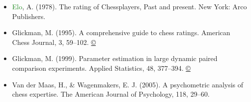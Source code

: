 \documentclass[12pt]{article}
\begin{document}
\begin{itemize}
        \item \textcolor{ForestGreen}{Elo}, A. (1978). The rating of Chessplayers, Past and present. New York: Arco Publishers.
        \item Glickman, M. (1995). A comprehensive guide to chess ratings. American Chess Journal, 3, 59--102. \href{https://drive.google.com/open?id=0BwdzQv8PTtSZcDROWjd1OXJYb2M}{\copyright}
        \item Glickman, M. (1999). Parameter estimation in large dynamic paired comparison experiments. Applied Statistics, 48, 377–394. \href{https://drive.google.com/open?id=0BwdzQv8PTtSZWFZIbC1OWGc4YTA}{\copyright}
        \item Van der Maas, H., & Wagenmakers, E. J. (2005). A psychometric analysis of chess expertise. The American Journal of Psychology, 118, 29–60.
    \end{itemize}
    
\end{document}
